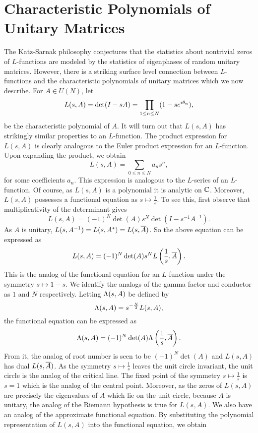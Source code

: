   \section{Characteristic Polynomials of Unitary Matrices}
    The Katz-Sarnak philosophy conjectures that the statistics about nontrivial zeros of $L$-functions are modeled by the statistics of eigenphases of random unitary matrices. However, there is a striking surface level connection between $L$-functions and the characteristic polynomials of unitary matrices which we now describe. For $A \in U(N)$, let
    \[
      L(s,A) = \det(I-sA) = \prod_{1 \le n \le N}(1-se^{i\theta_{n}}),
    \]
    be the characteristic polynomial of $A$. It will turn out that $L(s,A)$ has strikingly similar properties to an $L$-function. The product expression for $L(s,A)$ is clearly analogous to the Euler product expression for an $L$-function. Upon expanding the product, we obtain
    \[
      L(s,A) = \sum_{0 \le n \le N}a_{n}s^{n},
    \]
    for some coefficients $a_{n}$. This expression is analogous to the $L$-series of an $L$-function. Of course, as $L(s,A)$ is a polynomial it is analytic on $\mathbb{C}$. Moreover, $L(s,A)$ possesses a functional equation as $s \mapsto \frac{1}{s}$. To see this, first observe that multiplicativity of the determinant gives
    \[
      L(s,A) = (-1)^{N}\det(A)s^{N}\det(I-s^{-1}A^{-1}).
    \]
    As $A$ is unitary, $L(s,A^{-1}) = L(s,A^{\ast}) = L(s,\overline{A})$. So the above equation can be expressed as
    \[
      L(s,A) = (-1)^{N}\det(A)s^{N}L\left(\frac{1}{s},\overline{A}\right).
    \]
    This is the analog of the functional equation for an $L$-function under the symmetry $s \mapsto 1-s$. We identify the analogs of the gamma factor and conductor as $1$ and $N$ respectively. Letting $\Lambda(s,A)$ be defined by
    \[
      \Lambda(s,A) = s^{-\frac{N}{2}}L(s,A),
    \]
    the functional equation can be expressed as
    \[
        \Lambda(s,A) = (-1)^{N}\det(A) \Lambda\left(\frac{1}{s},\overline{A}\right).
    \]
    From it, the analog of root number is seen to be $(-1)^{N}\det(A)$ and $L(s,A)$ has dual $L(s,\overline{A})$. As the symmetry $s \mapsto \frac{1}{s}$ leaves the unit circle invariant, the unit circle is the analog of the critical line. The fixed point of the symmetry $s \mapsto \frac{1}{s}$ is $s = 1$ which is the analog of the central point. Moreover, as the zeros of $L(s,A)$ are precisely the eigenvalues of $A$ which lie on the unit circle, because $A$ is unitary, the analog of the Riemann hypothesis is true for $L(s,A)$. We also have an analog of the approximate functional equation. By substituting the polynomial representation of $L(s,A)$ into the functional equation, we obtain
